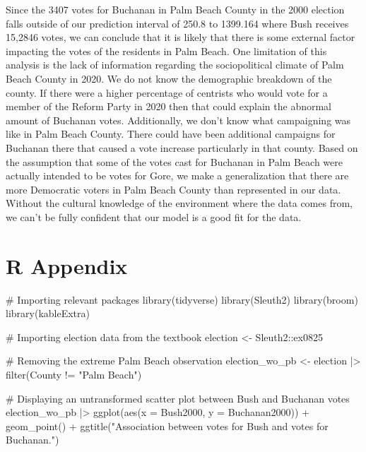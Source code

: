 \documentclass[
  letterpaper,
  DIV=11,
  numbers=noendperiod]{scrartcl}
\newenvironment{Shaded}{\begin{snugshade}}{\end{snugshade}}
\newcommand{\AttributeTok}[1]{\textcolor[rgb]{0.40,0.45,0.13}{#1}}
\newcommand{\CommentTok}[1]{\textcolor[rgb]{0.37,0.37,0.37}{#1}}
\newcommand{\FunctionTok}[1]{\textcolor[rgb]{0.28,0.35,0.67}{#1}}
\newcommand{\NormalTok}[1]{\textcolor[rgb]{0.00,0.23,0.31}{#1}}
\newcommand{\OtherTok}[1]{\textcolor[rgb]{0.00,0.23,0.31}{#1}}
\newcommand{\SpecialCharTok}[1]{\textcolor[rgb]{0.37,0.37,0.37}{#1}}
\newcommand{\StringTok}[1]{\textcolor[rgb]{0.13,0.47,0.30}{#1}}
\begin{document}
Since the 3407 votes for Buchanan in Palm Beach County in the 2000
election falls outside of our prediction interval of 250.8 to 1399.164
where Bush receives 15,2846 votes, we can conclude that it is likely
that there is some external factor impacting the votes of the residents
in Palm Beach. One limitation of this analysis is the lack of
information regarding the sociopolitical climate of Palm Beach County in
2020. We do not know the demographic breakdown of the county. If there
were a higher percentage of centrists who would vote for a member of the
Reform Party in 2020 then that could explain the abnormal amount of
Buchanan votes. Additionally, we don't know what campaigning was like in
Palm Beach County. There could have been additional campaigns for
Buchanan there that caused a vote increase particularly in that county.
Based on the assumption that some of the votes cast for Buchanan in Palm
Beach were actually intended to be votes for Gore, we make a
generalization that there are more Democratic voters in Palm Beach
County than represented in our data. Without the cultural knowledge of
the environment where the data comes from, we can't be fully confident
that our model is a good fit for the data.

\hypertarget{r-appendix}{%
\section{R Appendix}\label{r-appendix}}

\begin{Shaded}
\begin{Highlighting}[]
\CommentTok{\# Importing relevant packages}
\FunctionTok{library}\NormalTok{(tidyverse)}
\FunctionTok{library}\NormalTok{(Sleuth2)}
\FunctionTok{library}\NormalTok{(broom)}
\FunctionTok{library}\NormalTok{(kableExtra) }

\CommentTok{\# Importing election data from the textbook}
\NormalTok{election }\OtherTok{\textless{}{-}}\NormalTok{ Sleuth2}\SpecialCharTok{::}\NormalTok{ex0825}

\CommentTok{\# Removing the extreme Palm Beach observation}
\NormalTok{election\_wo\_pb }\OtherTok{\textless{}{-}}\NormalTok{ election }\SpecialCharTok{|\textgreater{}} \FunctionTok{filter}\NormalTok{(County }\SpecialCharTok{!=} \StringTok{"Palm Beach"}\NormalTok{)}

\CommentTok{\# Displaying an untransformed scatter plot between Bush and Buchanan votes}
\NormalTok{election\_wo\_pb }\SpecialCharTok{|\textgreater{}} \FunctionTok{ggplot}\NormalTok{(}\FunctionTok{aes}\NormalTok{(}\AttributeTok{x =}\NormalTok{ Bush2000, }\AttributeTok{y =}\NormalTok{ Buchanan2000)) }\SpecialCharTok{+} \FunctionTok{geom\_point}\NormalTok{() }\SpecialCharTok{+} \FunctionTok{ggtitle}\NormalTok{(}\StringTok{"Association between votes for Bush and votes for Buchanan."}\NormalTok{)}
\end{Highlighting}
\end{Shaded}
\end{document}
